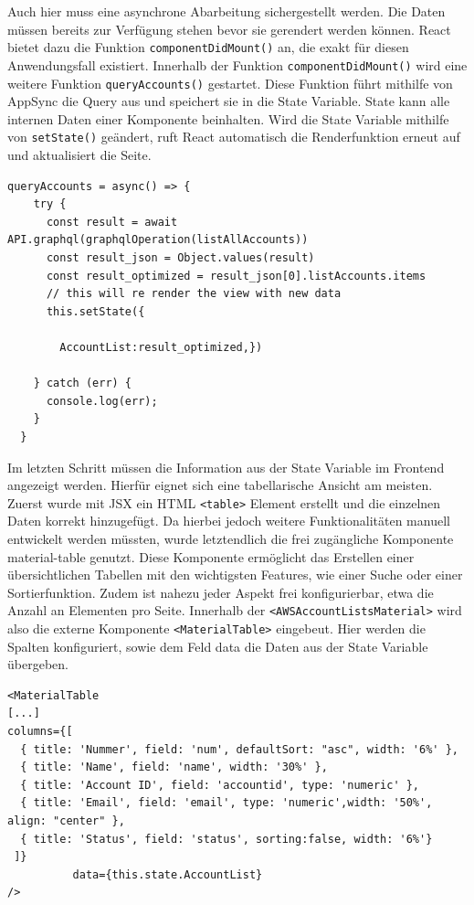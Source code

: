 Auch hier muss eine asynchrone Abarbeitung sichergestellt werden.
Die Daten müssen bereits zur Verfügung stehen bevor sie gerendert werden können.
React bietet dazu die Funktion \verb+componentDidMount()+ an, die exakt für diesen Anwendungsfall existiert. \cite[]{ReactComp}
Innerhalb der Funktion \verb+componentDidMount()+ wird eine weitere Funktion \verb+queryAccounts()+ gestartet.
Diese Funktion führt mithilfe von AppSync die Query aus und speichert sie in die State Variable.\cite[]{AmplifyAPI}
State kann alle internen Daten einer Komponente beinhalten.
Wird die State Variable mithilfe von \verb+setState()+ geändert, ruft React automatisch die Renderfunktion erneut auf und aktualisiert die Seite.
\\

\begin{lstlisting}[basicstyle=\ttfamily\small, breaklines=true , frame = single, backgroundcolor=\color{flashwhite} ]
queryAccounts = async() => {
    try {
      const result = await API.graphql(graphqlOperation(listAllAccounts))
      const result_json = Object.values(result)
      const result_optimized = result_json[0].listAccounts.items
      // this will re render the view with new data
      this.setState({

        AccountList:result_optimized,})

    } catch (err) {
      console.log(err);
    }
  }
\end{lstlisting}


Im letzten Schritt müssen die Information aus der State Variable im Frontend angezeigt werden.
Hierfür eignet sich eine tabellarische Ansicht am meisten.
Zuerst wurde mit JSX ein HTML \verb+<table>+ Element erstellt und die einzelnen Daten korrekt hinzugefügt.
Da hierbei jedoch weitere Funktionalitäten manuell entwickelt werden müssten, wurde letztendlich die frei zugängliche Komponente \glqq material-table\grqq{} genutzt.
Diese Komponente ermöglicht das Erstellen einer übersichtlichen Tabellen mit den wichtigsten Features, wie einer Suche oder einer Sortierfunktion.
Zudem ist nahezu jeder Aspekt frei konfigurierbar, etwa die Anzahl an Elementen pro Seite.\cite[]{MaterialTable}
Innerhalb der \verb+<AWSAccountListsMaterial>+ wird also die externe Komponente \verb+<MaterialTable>+ eingebeut.
Hier werden die Spalten konfiguriert, sowie dem Feld \glqq data\grqq{} die Daten aus der State Variable übergeben.

\begin{lstlisting}[basicstyle=\ttfamily\small, breaklines=true , frame = single, backgroundcolor=\color{flashwhite} ]
<MaterialTable
[...]
columns={[
  { title: 'Nummer', field: 'num', defaultSort: "asc", width: '6%' },
  { title: 'Name', field: 'name', width: '30%' },
  { title: 'Account ID', field: 'accountid', type: 'numeric' },
  { title: 'Email', field: 'email', type: 'numeric',width: '50%', align: "center" },
  { title: 'Status', field: 'status', sorting:false, width: '6%'}
 ]}
          data={this.state.AccountList}
/>
    \end{lstlisting}


